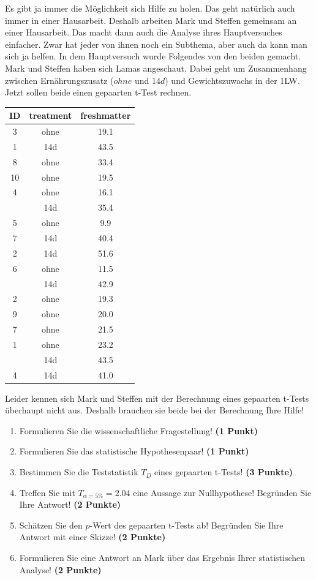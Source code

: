 \documentclass[a4paper, 9pt]{scrartcl}\usepackage[]{graphicx}\usepackage[]{xcolor}
\begin{document}
Es gibt ja immer die Möglichkeit sich Hilfe zu holen. Das geht natürlich auch immer in einer Hausarbeit. Deshalb arbeiten Mark und Steffen gemeinsam an einer Hausarbeit. Das macht dann auch die Analyse ihres Hauptversuches einfacher. Zwar hat jeder von ihnen noch ein Subthema, aber auch da kann man sich ja helfen. In dem Hauptversuch wurde Folgendes von den beiden gemacht. Mark und Steffen haben sich Lamas angeschaut. Dabei geht um Zusammenhang zwischen Ernährungszusatz ($ohne$ und $14d$) und Gewichtszuwachs in der 1LW. Jetzt sollen beide einen gepaarten t-Test rechnen.

\begin{table}[!h]
\centering
\begin{tabular}{ccc}
\toprule
ID & treatment & freshmatter\\
\midrule
3 & ohne & 19.1\\
1 & 14d & 43.5\\
8 & ohne & 33.4\\
10 & ohne & 19.5\\
4 & ohne & 16.1\\
\addlinespace
3 & 14d & 35.4\\
5 & ohne & 9.9\\
7 & 14d & 40.4\\
2 & 14d & 51.6\\
6 & ohne & 11.5\\
\addlinespace
6 & 14d & 42.9\\
2 & ohne & 19.3\\
9 & ohne & 20.0\\
7 & ohne & 21.5\\
1 & ohne & 23.2\\
\addlinespace
5 & 14d & 43.5\\
4 & 14d & 41.0\\
\bottomrule
\end{tabular}
\end{table}



Leider kennen sich Mark und Steffen mit der Berechnung eines gepaarten t-Tests überhaupt nicht aus. Deshalb brauchen sie beide bei der Berechnung Ihre Hilfe!

\begin{enumerate}
  \item Formulieren Sie die wissenschaftliche Fragestellung! \textbf{(1 Punkt)}
  \item Formulieren Sie das statistische Hypothesenpaar! \textbf{(1 Punkt)}
  \item Bestimmen Sie die Teststatistik $T_{D}$ eines gepaarten t-Tests! \textbf{(3 Punkte)}
  \item Treffen Sie mit $T_{\alpha = 5\%} = 2.04$ eine Aussage zur Nullhypothese! Begründen Sie Ihre Antwort! \textbf{(2 Punkte)}
\item Schätzen Sie den $p$-Wert des gepaarten t-Tests ab! Begründen Sie Ihre Antwort mit einer Skizze! \textbf{(2 Punkte)}
\item Formulieren Sie eine Antwort an Mark über das Ergebnis Ihrer statistischen Analyse! \textbf{(2 Punkte)}
\end{enumerate}
\end{document}
